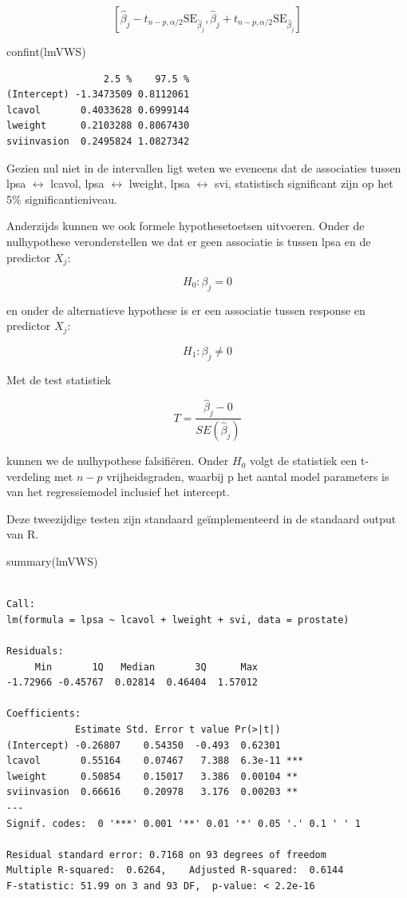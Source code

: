 \documentclass[
  dutch,
  letterpaper,
  12pt]{book}
\newenvironment{Shaded}{\begin{snugshade}}{\end{snugshade}}
\newcommand{\FunctionTok}[1]{\textcolor[rgb]{0.28,0.35,0.67}{#1}}
\newcommand{\NormalTok}[1]{\textcolor[rgb]{0.00,0.23,0.31}{#1}}
\theoremstyle{definition}
\theoremstyle{definition}
\theoremstyle{definition}
\theoremstyle{remark}
\begin{document}
\[
[\hat\beta_j - t_{n-p,\alpha/2} \text{SE}_{\hat\beta_j},\hat\beta_j + t_{n-p,\alpha/2} \text{SE}_{\hat\beta_j}]
\]

\begin{Shaded}
\begin{Highlighting}[]
\FunctionTok{confint}\NormalTok{(lmVWS)}
\end{Highlighting}
\end{Shaded}

\begin{verbatim}
                 2.5 %    97.5 %
(Intercept) -1.3473509 0.8112061
lcavol       0.4033628 0.6999144
lweight      0.2103288 0.8067430
sviinvasion  0.2495824 1.0827342
\end{verbatim}

Gezien nul niet in de intervallen ligt weten we eveneens dat de
associaties tussen lpsa \(\leftrightarrow\) lcavol, lpsa
\(\leftrightarrow\) lweight, lpsa \(\leftrightarrow\) svi, statistisch
significant zijn op het 5\% significantieniveau.

Anderzijds kunnen we ook formele hypothesetoetsen uitvoeren. Onder de
nulhypothese veronderstellen we dat er geen associatie is tussen lpsa en
de predictor \(X_j\):

\[H_0: \beta_j=0\]

en onder de alternatieve hypothese is er een associatie tussen response
en predictor \(X_j\):

\[H_1: \beta_j\neq0\]

Met de test statistiek

\[T=\frac{\hat{\beta}_j-0}{SE(\hat{\beta}_j)}\]

kunnen we de nulhypothese falsifiëren. Onder \(H_0\) volgt de statistiek
een t-verdeling met \(n-p\) vrijheidsgraden, waarbij p het aantal model
parameters is van het regressiemodel inclusief het intercept.

Deze tweezijdige testen zijn standaard geïmplementeerd in de standaard
output van R.

\begin{Shaded}
\begin{Highlighting}[]
\FunctionTok{summary}\NormalTok{(lmVWS)}
\end{Highlighting}
\end{Shaded}

\begin{verbatim}

Call:
lm(formula = lpsa ~ lcavol + lweight + svi, data = prostate)

Residuals:
     Min       1Q   Median       3Q      Max 
-1.72966 -0.45767  0.02814  0.46404  1.57012 

Coefficients:
            Estimate Std. Error t value Pr(>|t|)    
(Intercept) -0.26807    0.54350  -0.493  0.62301    
lcavol       0.55164    0.07467   7.388  6.3e-11 ***
lweight      0.50854    0.15017   3.386  0.00104 ** 
sviinvasion  0.66616    0.20978   3.176  0.00203 ** 
---
Signif. codes:  0 '***' 0.001 '**' 0.01 '*' 0.05 '.' 0.1 ' ' 1

Residual standard error: 0.7168 on 93 degrees of freedom
Multiple R-squared:  0.6264,    Adjusted R-squared:  0.6144 
F-statistic: 51.99 on 3 and 93 DF,  p-value: < 2.2e-16
\end{verbatim}
\end{document}

